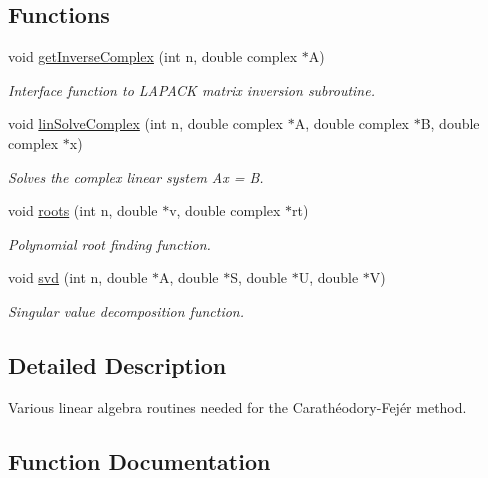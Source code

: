 \subsection*{Functions}
\begin{DoxyCompactItemize}
\item 
void \hyperlink{linear-algebra_8c_a2f33ac7496b7cd6fed5b44188e4aff1e}{get\+Inverse\+Complex} (int n, double complex $\ast$A)
\begin{DoxyCompactList}\small\item\em Interface function to L\+A\+P\+A\+CK matrix inversion subroutine. \end{DoxyCompactList}\item 
void \hyperlink{linear-algebra_8c_abe341bea743e72f19228e55d3fc02170}{lin\+Solve\+Complex} (int n, double complex $\ast$A, double complex $\ast$B, double complex $\ast$x)
\begin{DoxyCompactList}\small\item\em Solves the complex linear system Ax = B. \end{DoxyCompactList}\item 
void \hyperlink{linear-algebra_8c_ab95d3c92732d7711d9446fb25e0c6369}{roots} (int n, double $\ast$v, double complex $\ast$rt)
\begin{DoxyCompactList}\small\item\em Polynomial root finding function. \end{DoxyCompactList}\item 
void \hyperlink{linear-algebra_8c_a636107312a1724ef2534975b2ad05a83}{svd} (int n, double $\ast$A, double $\ast$S, double $\ast$U, double $\ast$V)
\begin{DoxyCompactList}\small\item\em Singular value decomposition function. \end{DoxyCompactList}\end{DoxyCompactItemize}


\subsection{Detailed Description}
Various linear algebra routines needed for the Carathéodory-\/\+Fejér method. 



\subsection{Function Documentation}
